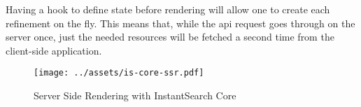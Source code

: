 Having a hook to define state before rendering will allow one to create each refinement on the fly. This means that, while the \acrshort{api} request goes through on the server once, just the needed resources will be fetched a second time from the client-side application. 

\begin{figure}[H]
  \centering
  \texttt{[image: ../assets/is-core-ssr.pdf]}
  \caption{Server Side Rendering with InstantSearch Core}
  \label{figure:is-core-ssr}
\end{figure}


